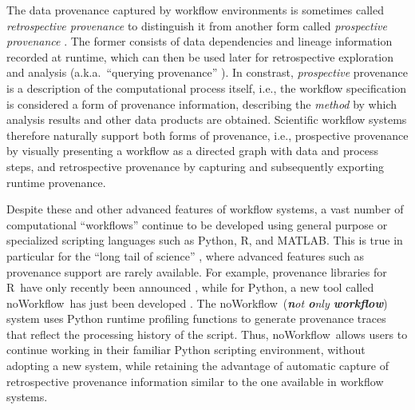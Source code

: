 \documentclass{article}
\newcommand{\NW}{\textsf{noWorkflow}}
\newcommand{\R}{\textsf{R}}
\newcommand{\MATLAB}{\textsf{MATLAB}}
\begin{document}
  The data provenance captured by workflow environments is sometimes
  called \emph{retrospective provenance} to distinguish it from
  another form called \emph{prospective provenance}
  \cite{Clifford2008original,Lim2010Prospective}. The former consists
  of data dependencies and lineage information recorded at runtime,
  which can then be used later for retrospective exploration and
  analysis (a.k.a.\ ``querying provenance''
  \cite{Davidson2008Provenance}). In constrast, \emph{prospective}
  provenance is a description of the computational process itself,
  i.e., the workflow specification is considered a form of provenance
  information, describing the \emph{method} by which analysis results
  and other data products are obtained. Scientific workflow systems
  therefore naturally support both forms of provenance, i.e.,
  prospective provenance by visually presenting a workflow as a
  directed graph with data and process steps, and retrospective
  provenance by capturing and subsequently exporting runtime
  provenance.

Despite these and other advanced features of workflow systems,
a vast number of computational ``workflows'' continue to be developed
using general purpose or specialized scripting languages such as
Python, \R, and \MATLAB. This is true in particular for the ``long
tail of science'' \cite{wallis2013if,Heidorn2008Shedding}, where
advanced features such as provenance support are rarely available.
For example, provenance libraries for \R\ have only recently been
announced \cite{Lerner2014RDataTracker}, while for Python, a new tool
called \NW\ has just been developed \cite{murta2014noWorkflow}. The
\NW\ (\emph{\textbf{n}ot \textbf{o}nly \textbf{workflow}}) system uses
Python runtime profiling functions to generate provenance traces that
reflect the processing history of the script. Thus, \NW\ allows users
to continue working in their familiar Python scripting environment,
without adopting a new system, while retaining the advantage of
automatic capture of retrospective provenance information similar to
the one available in workflow systems.
\end{document}
